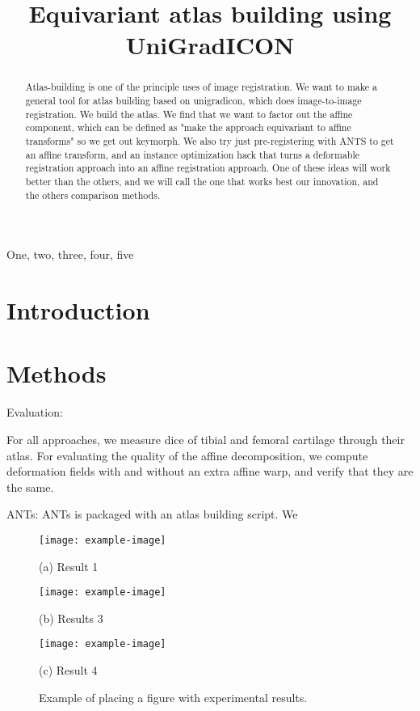 \documentclass{article}
\title{Equivariant atlas building using UniGradICON}
\begin{document}
\maketitle
\begin{abstract}
	Atlas-building is one of the principle uses of image registration. We want to make a general tool for atlas building based on unigradicon, which does image-to-image registration. We build the atlas. We find that we want to factor out the affine component, which can be defined as "make the approach equivariant to affine transforms" so we get out keymorph. We also try just pre-registering with ANTS to get an affine transform, and an instance optimization hack that turns a deformable registration approach into an affine registration approach. One of these ideas will work better than the others, and we will call the one that works best our innovation, and the others comparison methods.
\end{abstract}
\begin{keywords}
One, two, three, four, five
\end{keywords}
\section{Introduction}
\label{sec:intro}

\section{Methods}

Evaluation:

For all approaches, we measure dice of tibial and femoral cartilage through their atlas. For  evaluating the quality of the affine decomposition, we compute deformation fields with and without an extra affine warp, and verify that they are the same.

ANTs:
ANTs is packaged with an atlas building script. We 


\begin{figure}[htb]

\begin{minipage}[b]{1.0\linewidth}
  \centering
  \centerline{\texttt{[image: example-image]}}
  \centerline{(a) Result 1}\medskip
\end{minipage}
%
\begin{minipage}[b]{.48\linewidth}
  \centering
  \centerline{\texttt{[image: example-image]}}
  \centerline{(b) Results 3}\medskip
\end{minipage}
\hfill
\begin{minipage}[b]{0.48\linewidth}
  \centering
  \centerline{\texttt{[image: example-image]}}
  \centerline{(c) Result 4}\medskip
\end{minipage}
%
\caption{Example of placing a figure with experimental results.}
\label{fig:res}
%
\end{figure}
\end{document}
